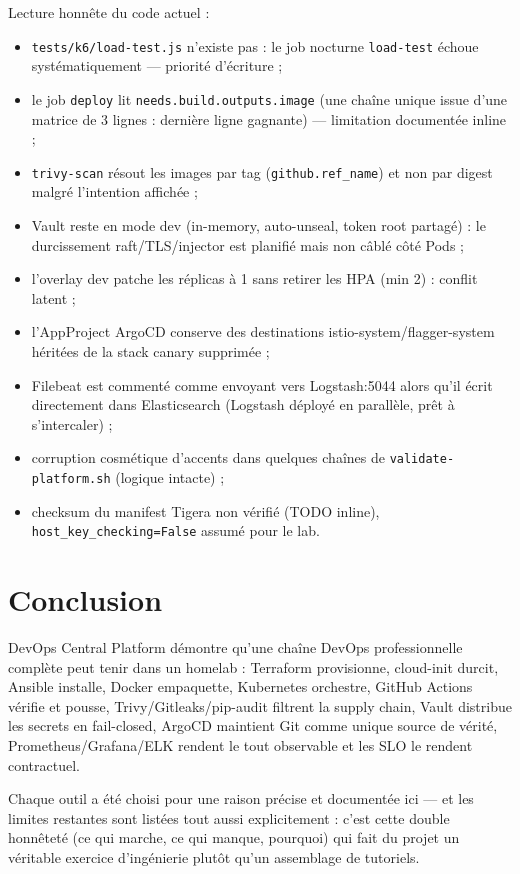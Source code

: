 \documentclass[11pt,a4paper]{article}
\begin{document}
Lecture honnête du code actuel :
\begin{itemize}[itemsep=2pt]
  \item \texttt{tests/k6/load-test.js} n'existe pas : le job nocturne \texttt{load-test} échoue systématiquement --- priorité d'écriture ;
  \item le job \texttt{deploy} lit \texttt{needs.build.outputs.image} (une chaîne unique issue d'une matrice de 3 lignes : dernière ligne gagnante) --- limitation documentée inline ;
  \item \texttt{trivy-scan} résout les images par tag (\texttt{github.ref\_name}) et non par digest malgré l'intention affichée ;
  \item Vault reste en mode dev (in-memory, auto-unseal, token root partagé) : le durcissement raft/TLS/injector est planifié mais non câblé côté Pods ;
  \item l'overlay dev patche les réplicas à 1 sans retirer les HPA (min 2) : conflit latent ;
  \item l'AppProject ArgoCD conserve des destinations istio-system/flagger-system héritées de la stack canary supprimée ;
  \item Filebeat est commenté comme envoyant vers Logstash:5044 alors qu'il écrit directement dans Elasticsearch (Logstash déployé en parallèle, prêt à s'intercaler) ;
  \item corruption cosmétique d'accents dans quelques chaînes de \texttt{validate-platform.sh} (logique intacte) ;
  \item checksum du manifest Tigera non vérifié (TODO inline), \texttt{host\_key\_checking=False} assumé pour le lab.
\end{itemize}

\section{Conclusion}

DevOps Central Platform démontre qu'une chaîne DevOps professionnelle complète peut tenir dans un homelab : Terraform provisionne, cloud-init durcit, Ansible installe, Docker empaquette, Kubernetes orchestre, GitHub Actions vérifie et pousse, Trivy/Gitleaks/pip-audit filtrent la supply chain, Vault distribue les secrets en fail-closed, ArgoCD maintient Git comme unique source de vérité, Prometheus/Grafana/ELK rendent le tout observable et les SLO le rendent contractuel.

Chaque outil a été choisi pour une raison précise et documentée ici --- et les limites restantes sont listées tout aussi explicitement : c'est cette double honnêteté (ce qui marche, ce qui manque, pourquoi) qui fait du projet un véritable exercice d'ingénierie plutôt qu'un assemblage de tutoriels.
\end{document}
